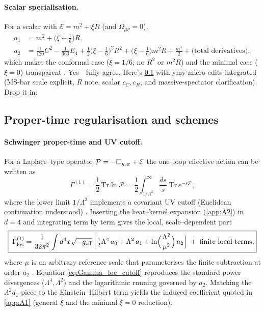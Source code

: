 \documentclass{iopjournal}
\begin{document}
\paragraph{Scalar specialisation.}
For a scalar with $\mathcal{E}=m^2+\xi R$ (and $\Omega_{\mu\nu}=0$),
\begin{align}
a_1 &= m^2+\Big(\xi+\frac{1}{6}\Big)R, \\
a_2 &= \frac{1}{120}C^2-\frac{1}{360}E_4
      +\frac{1}{2}\Big(\xi-\frac{1}{6}\Big)^{\!2} R^2
      +\Big(\xi-\frac{1}{6}\Big)m^2 R
      +\frac{m^4}{2}
      +\text{(total derivatives)}, \label{eq:a2_scalar_xi}
\end{align}
which makes the conformal case ($\xi=1/6$; no $R^2$ or $m^2R$) and the minimal case ($\xi=0$) transparent \cite{ParkerToms,Avramidi2000,Vassilevich2003}.
Yes—fully agree. Here's \cref{app:A3} with ymy micro-edits integrated (MS-bar scale explicit, $R$ note, scalar $c_C,c_R$, and massive-spectator clarification). Drop it in:


\subsection{Proper-time regularisation and schemes}\label{app:A3}

\paragraph{Schwinger proper-time and UV cutoff.}
For a Laplace–type operator $\mathcal{P}=-\Box_{g_{\rm eff}}+\mathcal{E}$ the one–loop effective action can be written as
\begin{equation}
\Gamma^{(1)}
=\frac{1}{2}\,\mathrm{Tr}\ln\mathcal{P}
=\frac{1}{2}\int_{1/\Lambda^2}^{\infty}\frac{ds}{s}\;\mathrm{Tr}\,e^{-s\mathcal{P}},
\label{eq:Gamma_propertime}
\end{equation}
where the lower limit $1/\Lambda^2$ implements a covariant UV cutoff (Euclidean continuation understood) \cite{DeWitt1965,ParkerToms,Vassilevich2003}. Inserting the heat–kernel expansion (\cref{app:A2}) in $d=4$ and integrating term by term gives the local, scale–dependent part
\begin{equation}
\boxed{\;
\Gamma^{(1)}_{\rm loc}
=\frac{1}{32\pi^2}\int d^4x\sqrt{-g_{\rm eff}}\,
\Big[\tfrac{1}{2}\Lambda^4\,a_0+\Lambda^2\,a_1
+\ln\!\Big(\frac{\Lambda^2}{\mu^2}\Big)\,a_2\Big]
\;+\;\text{finite local terms},
}
\label{eq:Gamma_loc_cutoff}
\end{equation}
where $\mu$ is an arbitrary reference scale that parameterises the finite subtraction at order $a_2$ \cite{ParkerToms,Vassilevich2003}. Equation \eqref{eq:Gamma_loc_cutoff} reproduces the standard power divergences ($\Lambda^4,\Lambda^2$) and the logarithmic running governed by $a_2$. Matching the $\Lambda^2 a_1$ piece to the Einstein–Hilbert term yields the induced coefficient quoted in \cref{app:A1} (general $\xi$ and the minimal $\xi=0$ reduction).
\end{document}
